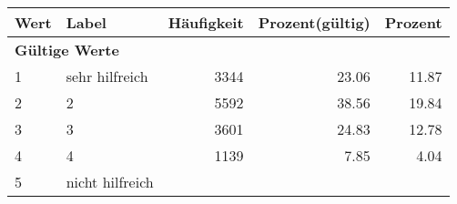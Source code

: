      \begin{longtable}{lXrrr}
     \toprule
     \textbf{Wert} & \textbf{Label} & \textbf{Häufigkeit} & \textbf{Prozent(gültig)} & \textbf{Prozent} \\
     \endhead
     \midrule
     \multicolumn{5}{l}{\textbf{Gültige Werte}}\\

     1 &
     \multicolumn{1}{X}{ sehr hilfreich   } &


       \num{3344} &
       \num[round-mode=places,round-precision=2]{23,06} &
         \num[round-mode=places,round-precision=2]{11,87} \\

     2 &
     \multicolumn{1}{X}{ 2   } &


       \num{5592} &
       \num[round-mode=places,round-precision=2]{38,56} &
         \num[round-mode=places,round-precision=2]{19,84} \\

     3 &
     \multicolumn{1}{X}{ 3   } &


       \num{3601} &
       \num[round-mode=places,round-precision=2]{24,83} &
         \num[round-mode=places,round-precision=2]{12,78} \\

     4 &
     \multicolumn{1}{X}{ 4   } &


       \num{1139} &
       \num[round-mode=places,round-precision=2]{7,85} &
         \num[round-mode=places,round-precision=2]{4,04} \\

     5 &
     \multicolumn{1}{X}{ nicht hilfreich   } &



\end{longtable}
